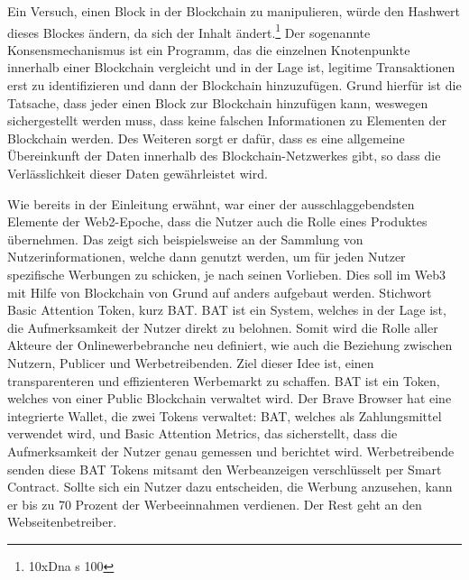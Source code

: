 Ein Versuch, einen Block in der Blockchain zu manipulieren, würde den Hashwert dieses Blockes ändern, da sich der Inhalt ändert.\footnote{10xDna s 100}
Der sogenannte Konsensmechanismus ist ein Programm, das die einzelnen Knotenpunkte innerhalb einer Blockchain vergleicht und in der Lage ist, legitime Transaktionen erst zu identifizieren und dann der Blockchain hinzuzufügen.
Grund hierfür ist die Tatsache, dass jeder einen Block zur Blockchain hinzufügen kann, weswegen sichergestellt werden muss, dass keine falschen Informationen zu Elementen der Blockchain werden.
Des Weiteren sorgt er dafür, dass es eine allgemeine Übereinkunft der Daten innerhalb des Blockchain-Netzwerkes gibt, so dass die Verlässlichkeit dieser Daten gewährleistet wird.

Wie bereits in der Einleitung erwähnt, war einer der ausschlaggebendsten Elemente der Web2-Epoche, dass die Nutzer auch die Rolle eines Produktes übernehmen. 
Das zeigt sich beispielsweise an der Sammlung von Nutzerinformationen, welche dann genutzt werden, um für jeden Nutzer spezifische Werbungen zu schicken, je nach seinen Vorlieben. 
Dies soll im Web3 mit Hilfe von Blockchain von Grund auf anders aufgebaut werden. Stichwort Basic Attention Token, kurz BAT. 
BAT ist ein System, welches in der Lage ist, die Aufmerksamkeit der Nutzer direkt zu belohnen. 
Somit wird die Rolle aller Akteure der Onlinewerbebranche neu definiert, wie auch die Beziehung zwischen Nutzern, Publicer und Werbetreibenden. 
Ziel dieser Idee ist, einen transparenteren und effizienteren Werbemarkt zu schaffen. BAT ist ein Token, welches von einer Public Blockchain verwaltet wird. 
Der Brave Browser hat eine integrierte Wallet, die zwei Tokens verwaltet: BAT, welches als Zahlungsmittel verwendet wird, und Basic Attention Metrics, das sicherstellt, dass die Aufmerksamkeit der Nutzer genau gemessen und berichtet wird. 
Werbetreibende senden diese BAT Tokens mitsamt den Werbeanzeigen verschlüsselt per Smart Contract. Sollte sich ein Nutzer dazu entscheiden, die Werbung anzusehen, kann er bis zu 70 Prozent der Werbeeinnahmen verdienen. 
Der Rest geht an den Webseitenbetreiber.


